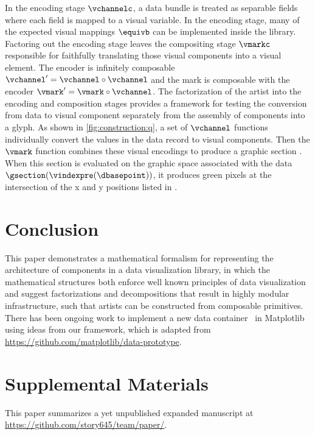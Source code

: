 \documentclass{vgtc}
\begin{document}
In the \textcolor{artist}{encoding} stage $\vchannelc$, a data bundle is treated as separable fields where each field is mapped to a visual variable. In the encoding stage, many of the expected visual mappings $\equivb$ can be implemented inside the library. Factoring out the encoding stage leaves the \textcolor{artist}{compositing} stage $\vmarkc$ responsible for faithfully translating those visual components into a visual element. The encoder is infinitely composable $\vchannel^{\prime}=\vchannel \circ \vchannel$ and the mark is composable with the encoder $\vmark^{\prime} = \vmark \circ \vchannel$. The factorization of the artist into the encoding and composition stages provides a framework for testing the conversion from data to visual component separately from the assembly of components into a glyph. As shown in \autoref{fig:construction:q}, a set of  $\vchannel$ functions individually convert the values in the data record to visual components. Then the $\vmark$ function combines these visual encodings to produce a graphic section \gsection. When this section is evaluated on the graphic space associated with the data $\gsection(\vindexpre(\dbasepoint))$, it produces green pixels at the intersection of the x and y positions listed in \vsection. 

\section{Conclusion}
This paper demonstrates a mathematical formalism for representing the architecture of components in a data visualization library, in which the mathematical structures both enforce well known principles of data visualization and suggest factorizations and decompositions that result in highly modular infrastructure, such that artists can be constructed from composable primitives. There has been ongoing work to implement a new data container~\cite{ProofConceptData} in Matplotlib using ideas from our framework, which is adapted from \url{https://github.com/matplotlib/data-prototype}. 


\section*{Supplemental Materials}
\label{sec:supplemental_materials}
This paper summarizes a yet unpublished expanded manuscript at \url{https://github.com/story645/team/paper/}.
\end{document}
